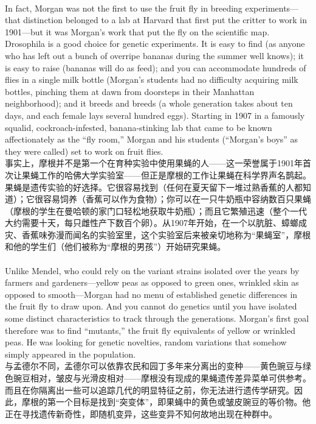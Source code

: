 \documentclass{article}
\begin{document}
\\
In fact, Morgan was not the first to use the fruit fly in breeding experiments—that distinction belonged to a lab at Harvard that first put the critter to work in 1901—but it was Morgan’s work that put the fly on the scientific map. Drosophila is a good choice for genetic experiments. It is easy to find (as anyone who has left out a bunch of overripe bananas during the summer well knows); it is easy to raise (bananas will do as feed); and you can accommodate hundreds of flies in a single milk bottle (Morgan’s students had no difficulty acquiring milk bottles, pinching them at dawn from doorsteps in their Manhattan neighborhood); and it breeds and breeds (a whole generation takes about ten days, and each female lays several hundred eggs). Starting in 1907 in a famously squalid, cockroach-infested, banana-stinking lab that came to be known affectionately as the “fly room,” Morgan and his students (“Morgan’s boys” as they were called) set to work on fruit flies.\\
事实上，摩根并不是第一个在育种实验中使用果蝇的人——这一荣誉属于1901年首次让果蝇工作的哈佛大学实验室——但正是摩根的工作让果蝇在科学界声名鹊起。果蝇是遗传实验的好选择。它很容易找到（任何在夏天留下一堆过熟香蕉的人都知道）；它很容易饲养（香蕉可以作为食物）；你可以在一只牛奶瓶中容纳数百只果蝇（摩根的学生在曼哈顿的家门口轻松地获取牛奶瓶）；而且它繁殖迅速（整个一代大约需要十天，每只雌性产下数百个卵）。从1907年开始，在一个以肮脏、蟑螂成灾、香蕉味弥漫而闻名的实验室里，这个实验室后来被亲切地称为“果蝇室”，摩根和他的学生们（他们被称为“摩根的男孩”）开始研究果蝇。\\

\\
Unlike Mendel, who could rely on the variant strains isolated over the years by farmers and gardeners—yellow peas as opposed to green ones, wrinkled skin as opposed to smooth—Morgan had no menu of established genetic differences in the fruit fly to draw upon. And you cannot do genetics until you have isolated some distinct characteristics to track through the generations. Morgan’s first goal therefore was to find “mutants,” the fruit fly equivalents of yellow or wrinkled peas. He was looking for genetic novelties, random variations that somehow simply appeared in the population.\\
与孟德尔不同，孟德尔可以依靠农民和园丁多年来分离出的变种——黄色豌豆与绿色豌豆相对，皱皮与光滑皮相对——摩根没有现成的果蝇遗传差异菜单可供参考。而且在你隔离出一些可以追踪几代的明显特征之前，你无法进行遗传学研究。因此，摩根的第一个目标是找到“突变体”，即果蝇中的黄色或皱皮豌豆的等价物。他正在寻找遗传新奇性，即随机变异，这些变异不知何故地出现在种群中。\\
\end{document}
